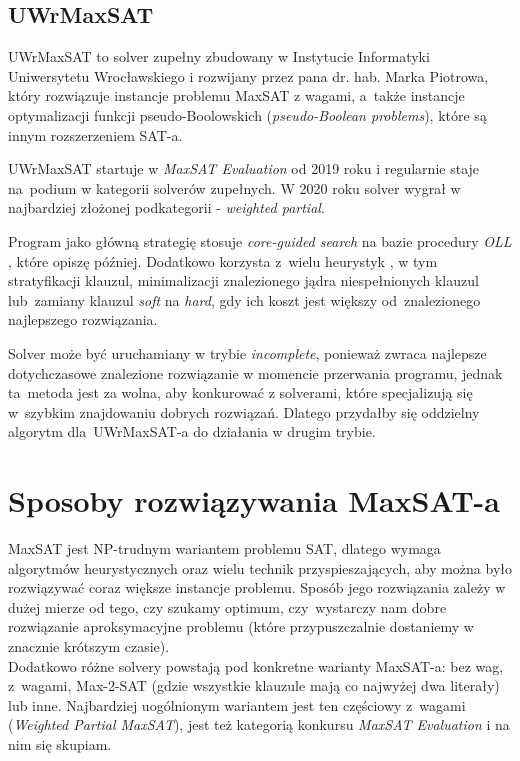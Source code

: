 \documentclass[shortabstract]{iithesis}
\begin{document}
\section{UWrMaxSAT}
UWrMaxSAT \cite{uwrmaxsat} to solver zupełny zbudowany w Instytucie Informatyki Uniwersytetu Wrocławskiego i rozwijany przez pana dr. hab. Marka Piotrowa, który rozwiązuje instancje problemu MaxSAT z wagami, a~także instancje optymalizacji funkcji pseudo-Boolowskich \cite{pb} (\textit{pseudo-Boolean problems}), które są innym rozszerzeniem SAT-a.

\noindent UWrMaxSAT startuje w \textit{MaxSAT Evaluation} od 2019 roku i regularnie staje na~podium w kategorii solverów zupełnych. W 2020 roku solver wygrał w najbardziej złożonej podkategorii - \textit{weighted partial}.

Program jako główną strategię stosuje \textit{core-guided search} na bazie procedury \textit{OLL} \cite{oll}, które opiszę później. Dodatkowo korzysta z~wielu heurystyk \cite{stratification}, w tym stratyfikacji klauzul, minimalizacji znalezionego jądra niespełnionych klauzul lub~zamiany klauzul \textit{soft} na \textit{hard}, gdy ich koszt jest większy od~znalezionego najlepszego rozwiązania.

Solver może być uruchamiany w trybie \textit{incomplete}, ponieważ zwraca najlepsze dotychczasowe znalezione rozwiązanie w momencie przerwania programu, jednak ta~metoda jest za wolna, aby konkurować z solverami, które specjalizują się w~szybkim znajdowaniu dobrych rozwiązań.
Dlatego przydałby się oddzielny algorytm dla~UWrMaxSAT-a do działania w drugim trybie.
\chapter{Sposoby rozwiązywania MaxSAT-a}
MaxSAT jest NP-trudnym wariantem problemu SAT, dlatego wymaga algorytmów heurystycznych oraz wielu technik przyspieszających, aby można było rozwiązywać coraz większe instancje problemu.
Sposób jego rozwiązania zależy w dużej mierze od tego, czy szukamy optimum, czy~wystarczy nam dobre rozwiązanie aproksymacyjne problemu (które przypuszczalnie dostaniemy w znacznie krótszym czasie). \\
Dodatkowo różne solvery powstają pod konkretne warianty MaxSAT-a: bez wag, z~wagami, Max-2-SAT (gdzie wszystkie klauzule mają co najwyżej dwa literały) lub inne. Najbardziej uogólnionym wariantem jest ten częściowy z~wagami (\textit{Weighted Partial MaxSAT}), jest też kategorią konkursu \textit{MaxSAT Evaluation} i na nim się skupiam.
\end{document}
